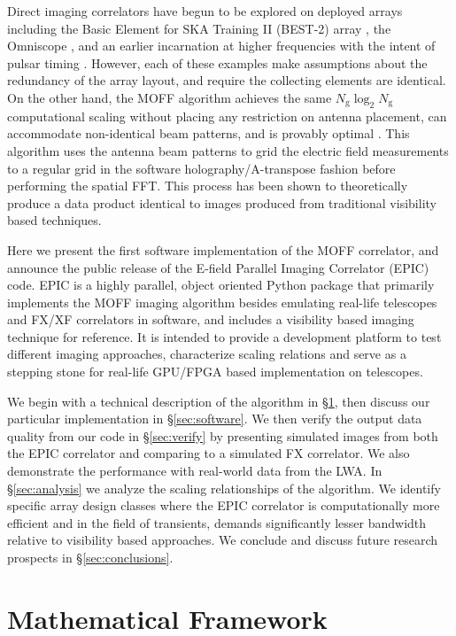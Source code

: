 \documentclass[a4paper,fleqn,usenatbib]{mnras}
\newcommand{\Ngrid}{N_\textrm{g}}
\begin{document}
Direct imaging correlators have begun to be explored on deployed arrays including
the Basic Element for SKA Training II (BEST-2) array \citep{fos14}, the Omniscope
\citep{zhe14}, and an earlier incarnation at higher frequencies with the intent
of pulsar timing \citep{oto94, dai00}. However, each of these examples make
assumptions about the redundancy of the array layout, and require the collecting
elements are identical. On the other hand, the MOFF algorithm achieves the same
$\Ngrid \log_2 \Ngrid$ computational scaling without placing any restriction on
antenna placement, can accommodate non-identical beam patterns, and is provably 
optimal \citep{mor11}. This algorithm uses the antenna beam patterns to 
grid the electric field measurements to a regular grid in the software 
holography/A-transpose fashion \citep{mor09,bha08,teg97b} before performing the
spatial FFT. This process has been shown to theoretically produce a data product
identical to images produced from traditional visibility based techniques.

Here we present the first software implementation of the MOFF correlator, and
announce the public release of the E-field Parallel Imaging Correlator (EPIC)
code. EPIC is a highly parallel, object oriented Python package that primarily 
implements the MOFF imaging algorithm besides emulating real-life telescopes and 
FX/XF correlators in software, and includes a visibility based imaging technique 
for reference. It is intended to provide a development platform to test different 
imaging approaches, characterize scaling relations and serve as a stepping stone 
for real-life GPU/FPGA based implementation on telescopes.

We begin with a technical description of the algorithm in \S\ref{sec:math}, 
then discuss our particular implementation in \S\ref{sec:software}. We then 
verify the output data quality from our code in \S\ref{sec:verify} by presenting 
simulated images from both the EPIC correlator and comparing to a simulated FX 
correlator. We also demonstrate the performance with real-world data from the 
LWA. In \S \ref{sec:analysis} we analyze the scaling relationships of the 
algorithm. We identify specific array design classes where the EPIC correlator 
is computationally more efficient and in the field of transients, demands 
significantly lesser bandwidth relative to visibility based approaches. We 
conclude and discuss future research prospects in \S\ref{sec:conclusions}.

\section{Mathematical Framework}\label{sec:math}
\end{document}
